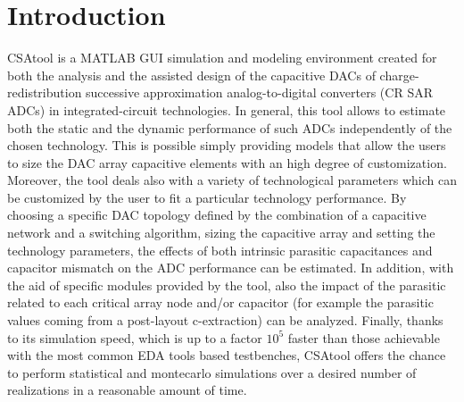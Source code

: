 \label{intro}

\section{Introduction}
CSAtool is a MATLAB GUI simulation and modeling environment created for both the analysis and the assisted design of the capacitive DACs of charge-redistribution successive approximation analog-to-digital converters (CR SAR ADCs) in integrated-circuit technologies. In general, this tool allows to estimate both the static and the dynamic performance of such ADCs independently of the chosen technology.
This is possible simply providing models that allow the users to size the DAC array capacitive elements with an high degree of customization.
Moreover, the tool deals also with a variety of technological parameters which can be customized by the user to fit a particular technology performance.
By choosing a specific DAC topology defined by the combination of a capacitive network and a switching algorithm, sizing the capacitive array and setting the technology parameters, the effects of both intrinsic parasitic capacitances and capacitor mismatch on the ADC performance can be estimated.
In addition, with the aid of specific modules provided by the tool, also the impact  of the parasitic related to each critical array node and/or capacitor (for example the parasitic values coming from a post-layout c-extraction) can be analyzed. 
Finally, thanks to its simulation speed, which is up to a factor $10^5$ faster than those achievable with the most common EDA tools based testbenches, CSAtool offers the chance to perform statistical and montecarlo simulations over a desired number of realizations in a reasonable amount of time.
